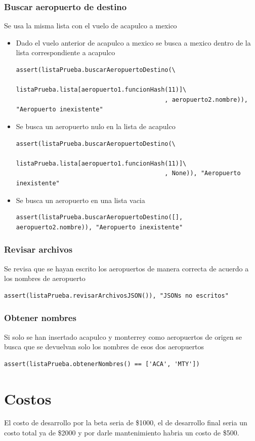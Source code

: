\documentclass[12pt]{article}
\begin{document}
\subsubsection{Buscar aeropuerto de destino}
Se usa la misma lista con el vuelo de acapulco a mexico
\begin{itemize}
\item Dado el vuelo anterior de acapulco a mexico se busca a mexico dentro de la lista correspondiente a acapulco
\begin{verbatim}
assert(listaPrueba.buscarAeropuertoDestino(\
                                          listaPrueba.lista[aeropuerto1.funcionHash(11)]\
                                         , aeropuerto2.nombre)), "Aeropuerto inexistente"
\end{verbatim}
\item Se busca un aeropuerto nulo en la lista de acapulco
\begin{verbatim}
assert(listaPrueba.buscarAeropuertoDestino(\
                                          listaPrueba.lista[aeropuerto1.funcionHash(11)]\
                                         , None)), "Aeropuerto inexistente"
\end{verbatim}
\item Se busca un aeropuerto en una lista vacia
\begin{verbatim}
assert(listaPrueba.buscarAeropuertoDestino([], aeropuerto2.nombre)), "Aeropuerto inexistente"
\end{verbatim}
\end{itemize}
\subsubsection{Revisar archivos}
Se revisa que se hayan escrito los aeropuertos de manera correcta de acuerdo a los nombres de aeropuerto
\begin{verbatim}
assert(listaPrueba.revisarArchivosJSON()), "JSONs no escritos"
\end{verbatim}  
\subsubsection{Obtener nombres}
Si solo se han insertado acapulco y monterrey como aeropuertos de origen se busca que se devuelvan solo los nombres de esos dos aeropuertos
\begin{verbatim}
assert(listaPrueba.obtenerNombres() == ['ACA', 'MTY'])
\end{verbatim}
\section{Costos}
El costo de desarrollo por la beta seria de \$1000, el de desarrollo final seria un costo total ya de \$2000 y por darle mantenimiento habria un costo de \$500.
\end{document}
